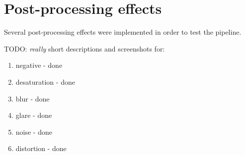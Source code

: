 \clearpage
\section{Post-processing effects}

Several post-processing effects were implemented in order to test the pipeline.

TODO: \emph{really} short descriptions and screenshots for:
	
\begin{enumerate}
\item negative - done
\item desaturation - done
\item blur - done
\item glare - done
\item noise - done
\item distortion - done
\end{enumerate}

